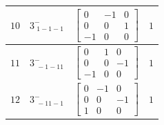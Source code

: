 \documentclass[fleqn,8pt]{jsarticle}
\begin{document}
\begin{longtable}{cccc}
$ 10 $ & $ 3^{-}_{\,\,1-1-1} $ & $ \begin{bmatrix} 0 & -1 & 0 \\ 0 & 0 & 1 \\ -1 & 0 & 0 \end{bmatrix} $ & $ 1 $ \\ \hline
$ 11 $ & $ 3^{-}_{\,\,-1-11} $ & $ \begin{bmatrix} 0 & 1 & 0 \\ 0 & 0 & -1 \\ -1 & 0 & 0 \end{bmatrix} $ & $ 1 $ \\ \hline
$ 12 $ & $ 3^{-}_{\,\,-11-1} $ & $ \begin{bmatrix} 0 & -1 & 0 \\ 0 & 0 & -1 \\ 1 & 0 & 0 \end{bmatrix} $ & $ 1 $ \\
\end{longtable}
\end{document}
